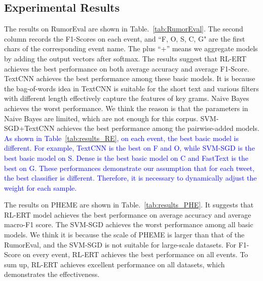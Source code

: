 \documentclass[review]{elsarticle}
\begin{document}
\subsection{Experimental Results}
The results on RumorEval are shown in Table.~{\ref{tab:RumorEval}}. The second column records the F1-Scores on each event, and ``F, O, S, C, G" are the first chars of the corresponding event name. The plus ``+'' means we aggregate models by adding the output vectors after softmax. The results suggest that RL-ERT achieves the best performance on both average accuracy and average F1-Score. TextCNN achieves the best performance among these basic models. It is because the bag-of-words idea in TextCNN is suitable for the short text and various filters with different length effectively capture the features of key grams. Naive Bayes achieves the worst performance. We think the reason is that the parameters in Naive Bayes are limited, which are not enough for this corpus. SVM-SGD+TextCNN achieves the best performance among the pairwise-added models. \textcolor{blue}{As shown in Table~\ref{tab:results_RE}, on each event, the best basic model is different. For example, TextCNN is the best on F and O, while SVM-SGD is the best basic model on S. Dense is the best basic model on C and FastText is the best on G. These performances demonstrate our assumption that for each tweet, the best classifier is different. Therefore, it is necessary to dynamically adjust the weight for each sample.}

The results on PHEME are shown in Table.~\ref{tab:results_PHE}. It suggests that RL-ERT model achieves the best performance on average accuracy and average macro-F1 score. The SVM-SGD achieves the worst performance among all basic models. We think it is because the scale of PHEME is larger than that of the RumorEval, and the SVM-SGD is not suitable for large-scale datasets. For F1-Score on every event, RL-ERT achieves the best performance on all events. To sum up, RL-ERT achieves excellent performance on all datasets, which demonstrates the effectiveness.
\end{document}
